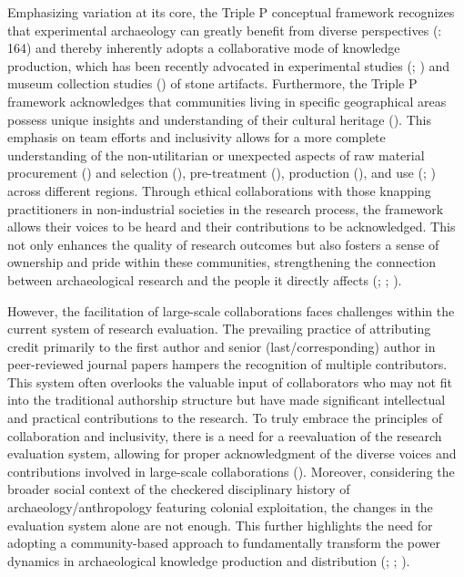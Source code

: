 \documentclass[
  11pt,
  letterpaper,
  DIV=11,
  numbers=noendperiod]{scrartcl}
\begin{document}
Emphasizing variation at its core, the Triple P conceptual framework
recognizes that experimental archaeology can greatly benefit from
diverse perspectives (: 164) and thereby inherently adopts a collaborative mode of
knowledge production, which has been recently advocated in experimental
studies (; ) and
museum collection studies ()
of stone artifacts. Furthermore, the Triple P framework acknowledges
that communities living in specific geographical areas possess unique
insights and understanding of their cultural heritage
(). This emphasis on team
efforts and inclusivity allows for a more complete understanding of the
non-utilitarian or unexpected aspects of raw material procurement
() and selection
(), pre-treatment
(), production
(), and use
(;
) across different regions.
Through ethical collaborations with those knapping practitioners in
non-industrial societies in the research process, the framework allows
their voices to be heard and their contributions to be acknowledged.
This not only enhances the quality of research outcomes but also fosters
a sense of ownership and pride within these communities, strengthening
the connection between archaeological research and the people it
directly affects (;
;
).

However, the facilitation of large-scale collaborations faces challenges
within the current system of research evaluation. The prevailing
practice of attributing credit primarily to the first author and senior
(last/corresponding) author in peer-reviewed journal papers hampers the
recognition of multiple contributors. This system often overlooks the
valuable input of collaborators who may not fit into the traditional
authorship structure but have made significant intellectual and
practical contributions to the research. To truly embrace the principles
of collaboration and inclusivity, there is a need for a reevaluation of
the research evaluation system, allowing for proper acknowledgment of
the diverse voices and contributions involved in large-scale
collaborations (). Moreover,
considering the broader social context of the checkered disciplinary
history of archaeology/anthropology featuring colonial exploitation, the
changes in the evaluation system alone are not enough. This further
highlights the need for adopting a community-based approach to
fundamentally transform the power dynamics in archaeological knowledge
production and distribution (;
;
).
\end{document}

